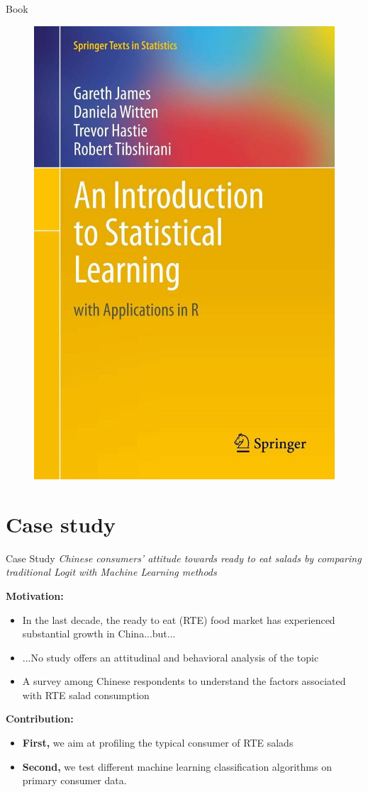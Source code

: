 \documentclass[12pt]{beamer}
\begin{document}
\begin{frame}{Book}
		\begin{figure}
		\centering
		\includegraphics[width=.45\linewidth]{book}		
	\end{figure}
\end{frame}

\section{Case study}

\begin{frame}{Case Study}
\textit{Chinese consumers’ attitude towards ready to eat salads by comparing traditional Logit with Machine Learning methods}
\end{frame}

\begin{frame}
	\footnotesize
	\textbf{Motivation:}
	\begin{itemize}
	\item In the last decade, the ready to eat (RTE) food market has experienced substantial growth in China...but...
	\item ...No study offers an attitudinal and behavioral analysis of the topic
	\item A survey among Chinese respondents to understand the factors associated with RTE salad consumption
	\end{itemize}

	\textbf{Contribution:}
	\begin{itemize}
	\item \textbf{First,} we aim at profiling the typical consumer of RTE salads
	\item \textbf{Second,} we test different machine learning classification algorithms on primary consumer data.
	\end{itemize}


 \end{frame}
\end{document}
